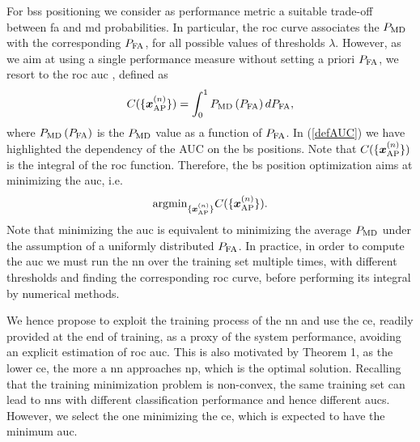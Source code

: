 \documentclass[conference,final]{IEEEtran}
\begin{document}
For  \acp{bs} positioning we consider as performance metric a suitable trade-off between \ac{fa} and \ac{md} probabilities. In particular, the \ac{roc} curve associates the $P_{\rm MD}$ with the corresponding $P_{\rm FA}$, for all possible values of thresholds $\lambda$. However, as we aim at using a single performance measure without setting a priori  $P_{\rm FA}$, we  resort to the \ac{roc} \ac{auc} \cite{hanley-82}, defined as 
\begin{equation}
    C(\{\bm{x}_{\rm AP}^{(n)}\})  = \int_{0}^{1} P_{\rm MD}\left(P_{\rm FA}\right) d P_{\rm FA},
    \label{defAUC}
\end{equation}
where $P_{\rm MD}\left(P_{\rm FA}\right)$ is the $P_{\rm MD}$ value as a function of $P_{\rm FA}$. In (\ref{defAUC}) we have highlighted the dependency of the AUC on the \ac{bs} positions. Note that  $C(\{\bm{x}_{\rm AP}^{(n)}\})  $ is  the integral of the \ac{roc} function. Therefore, the \ac{bs} position optimization aims at minimizing the \ac{auc}, i.e.
\begin{equation}
    {\rm argmin}_{\{\bm{x}_{\rm AP}^{(n)}\}} C(\{\bm{x}_{\rm AP}^{(n)}\}). 
    \label{defoptpos}
\end{equation}
Note that minimizing the \ac{auc} is equivalent to minimizing the average $P_{\rm MD}$ under the assumption of a  uniformly distributed $P_{\rm FA}$.
In practice, in order to compute the \ac{auc} we must run the \ac{nn} over the training set  multiple times, with different thresholds and finding the corresponding \ac{roc} curve, before performing its integral by numerical methods.

We hence propose to exploit the training process of the \ac{nn} and use the \ac{ce}, readily provided at the end of training, as a proxy of the system performance, avoiding an explicit estimation of  \ac{roc}  \ac{auc}. This is also motivated by Theorem 1, as the lower \ac{ce}, the more a \ac{nn} approaches \ac{np}, which is the optimal solution. 
Recalling that the training minimization problem is non-convex, the same training set can lead to \acp{nn} with different classification performance and hence different \acp{auc}. However, we select the one minimizing the   \ac{ce}, which is expected to have the minimum \ac{auc}.
\end{document}
